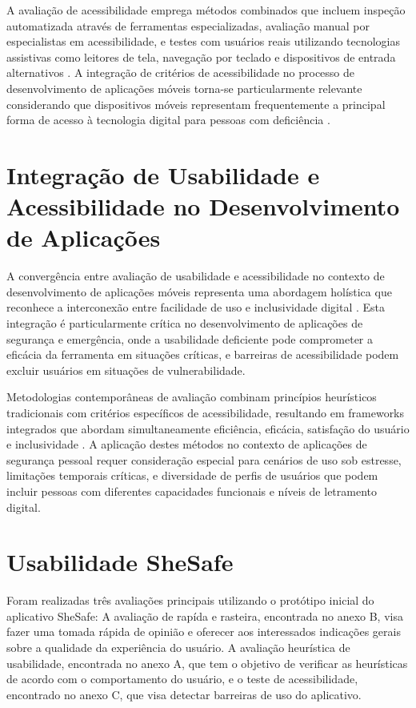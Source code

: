 A avaliação de acessibilidade emprega métodos combinados que incluem inspeção automatizada através de ferramentas especializadas, avaliação manual por especialistas em acessibilidade, e testes com usuários reais utilizando tecnologias assistivas como leitores de tela, navegação por teclado e dispositivos de entrada alternativos \cite{abascal2019inclusive}. A integração de critérios de acessibilidade no processo de desenvolvimento de aplicações móveis torna-se particularmente relevante considerando que dispositivos móveis representam frequentemente a principal forma de acesso à tecnologia digital para pessoas com deficiência \cite{trewin2013mobile}.

\section{Integração de Usabilidade e Acessibilidade no Desenvolvimento de Aplicações}
A convergência entre avaliação de usabilidade e acessibilidade no contexto de desenvolvimento de aplicações móveis representa uma abordagem holística que reconhece a interconexão entre facilidade de uso e inclusividade digital \cite{power2012equal}. Esta integração é particularmente crítica no desenvolvimento de aplicações de segurança e emergência, onde a usabilidade deficiente pode comprometer a eficácia da ferramenta em situações críticas, e barreiras de acessibilidade podem excluir usuários em situações de vulnerabilidade.

Metodologias contemporâneas de avaliação combinam princípios heurísticos tradicionais com critérios específicos de acessibilidade, resultando em frameworks integrados que abordam simultaneamente eficiência, eficácia, satisfação do usuário e inclusividade \cite{yesilada2015evaluating}. A aplicação destes métodos no contexto de aplicações de segurança pessoal requer consideração especial para cenários de uso sob estresse, limitações temporais críticas, e diversidade de perfis de usuários que podem incluir pessoas com diferentes capacidades funcionais e níveis de letramento digital.

\section{Usabilidade SheSafe}

Foram realizadas três avaliações principais utilizando o protótipo inicial do aplicativo SheSafe: A avaliação de rapída e rasteira, encontrada no anexo B, visa fazer uma tomada rápida de opinião e oferecer aos interessados indicações gerais sobre a qualidade da experiência do usuário. A avaliação heurística de usabilidade, encontrada no anexo A, que tem o objetivo de verificar as heurísticas de acordo com o comportamento do usuário, e o teste de acessibilidade, encontrado no anexo C, que visa detectar barreiras de uso do aplicativo.

